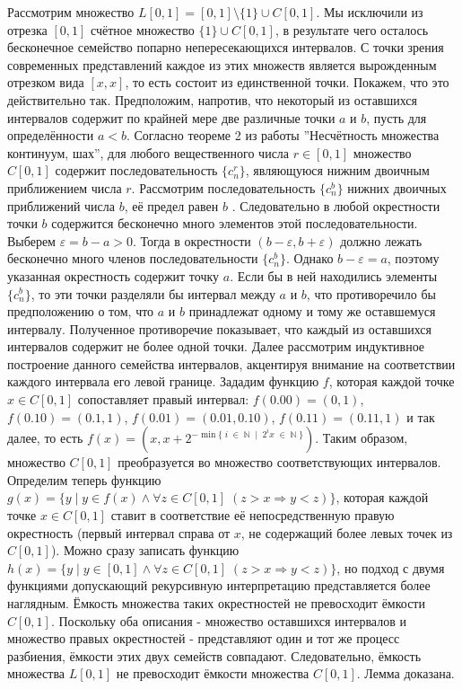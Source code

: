 \documentclass[12pt]{article}
\begin{document}
Рассмотрим множество $L[0, 1] = [0, 1] \setminus \{1\} \cup C[0, 1]$. Мы исключили из отрезка $[0, 1]$ счётное множество $\{1\} \cup C[0,1]$, в результате чего осталось бесконечное семейство попарно непересекающихся интервалов. С точки зрения современных представлений каждое из этих множеств является вырожденным отрезком вида $[x, x]$, то есть состоит из единственной точки. Покажем, что это действительно так. Предположим, напротив, что некоторый из оставшихся интервалов содержит по крайней мере две различные точки $a$ и $b$, пусть для определённости $a < b$. Согласно теореме 2 из работы ''Несчётность множества континуум, шах'', для любого вещественного числа $r \in [0, 1]$ множество $C[0, 1]$ содержит последовательность $\{c^r_n\}$, являющуюся нижним двоичным приближением числа $r$. Рассмотрим последовательность $\{c^b_n\}$ нижних двоичных приближений числа $b$, её предел равен $b$ \cite{matan-bottom-limit}. Следовательно в любой окрестности точки $b$ содержится бесконечно много элементов этой последовательности. Выберем $\varepsilon = b - a > 0$. Тогда в окрестности $(b - \varepsilon, b + \varepsilon)$ должно лежать бесконечно много членов последовательности $\{c^b_n\}$. Однако $b - \varepsilon = a$, поэтому указанная окрестность содержит точку $a$. Если бы в ней находились элементы $\{c^b_n\}$, то эти точки разделяли бы интервал между $a$ и $b$, что противоречило бы предположению о том, что $a$ и $b$ принадлежат одному и тому же оставшемуся интервалу. Полученное противоречие показывает, что каждый из оставшихся интервалов содержит не более одной точки. Далее рассмотрим индуктивное построение данного семейства интервалов, акцентируя внимание на соответствии каждого интервала его левой границе. Зададим функцию $f$, которая каждой точке $x \in C[0, 1]$ сопоставляет правый интервал: $f(0.00) = (0, 1)$, $f(0.10) = (0.1, 1)$, $f(0.01) = (0.01, 0.10)$, $f(0.11) = (0.11, 1)$ и так далее, то есть $f(x) = (x, x + 2^{ -\min \{ \; i \; \in \; \mathbb{N} \; \mid \; 2^{i}x \; \in \; \mathbb{N} \; \} })$. Таким образом, множество $C[0, 1]$ преобразуется во множество соответствующих интервалов. Определим теперь функцию $g(x) = \{ y \mid y \in f(x) \wedge \forall z \in C[0, 1] \; (z > x \Rightarrow y < z) \}$, которая каждой точке $x \in C[0, 1]$ ставит в соответствие её непосредственную правую окрестность (первый интервал справа от $x$, не содержащий более левых точек из $C[0, 1]$). Можно сразу записать функцию $h(x) = \{ y \mid y \in [0, 1] \wedge \forall z \in C[0, 1] \; (z > x \Rightarrow y < z) \}$, но подход с двумя функциями допускающий рекурсивную интерпретацию представляется более наглядным. Ёмкость множества таких окрестностей не превосходит ёмкости $C[0, 1]$. Поскольку оба описания - множество оставшихся интервалов и множество правых окрестностей - представляют один и тот же процесс разбиения, ёмкости этих двух семейств совпадают. Следовательно, ёмкость множества $L[0, 1]$ не превосходит ёмкости множества $C[0, 1]$. Лемма доказана.
\end{document}
